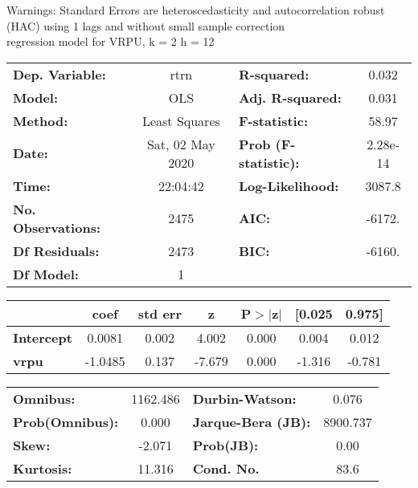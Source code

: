 Warnings: \newline
 [1] Standard Errors are heteroscedasticity and autocorrelation robust (HAC) using 1 lags and without small sample correction\\ 

regression model for VRPU, k = 2 h = 12\begin{center}
\begin{tabular}{lclc}
\toprule
\textbf{Dep. Variable:}    &       rtrn       & \textbf{  R-squared:         } &     0.032   \\
\textbf{Model:}            &       OLS        & \textbf{  Adj. R-squared:    } &     0.031   \\
\textbf{Method:}           &  Least Squares   & \textbf{  F-statistic:       } &     58.97   \\
\textbf{Date:}             & Sat, 02 May 2020 & \textbf{  Prob (F-statistic):} &  2.28e-14   \\
\textbf{Time:}             &     22:04:42     & \textbf{  Log-Likelihood:    } &    3087.8   \\
\textbf{No. Observations:} &        2475      & \textbf{  AIC:               } &    -6172.   \\
\textbf{Df Residuals:}     &        2473      & \textbf{  BIC:               } &    -6160.   \\
\textbf{Df Model:}         &           1      & \textbf{                     } &             \\
\bottomrule
\end{tabular}
\begin{tabular}{lcccccc}
                   & \textbf{coef} & \textbf{std err} & \textbf{z} & \textbf{P$> |$z$|$} & \textbf{[0.025} & \textbf{0.975]}  \\
\midrule
\textbf{Intercept} &       0.0081  &        0.002     &     4.002  &         0.000        &        0.004    &        0.012     \\
\textbf{vrpu}      &      -1.0485  &        0.137     &    -7.679  &         0.000        &       -1.316    &       -0.781     \\
\bottomrule
\end{tabular}
\begin{tabular}{lclc}
\textbf{Omnibus:}       & 1162.486 & \textbf{  Durbin-Watson:     } &    0.076  \\
\textbf{Prob(Omnibus):} &   0.000  & \textbf{  Jarque-Bera (JB):  } & 8900.737  \\
\textbf{Skew:}          &  -2.071  & \textbf{  Prob(JB):          } &     0.00  \\
\textbf{Kurtosis:}      &  11.316  & \textbf{  Cond. No.          } &     83.6  \\
\bottomrule
\end{tabular}
\end{center}

